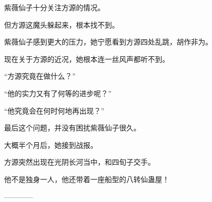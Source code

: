 \begin{this_body}
紫薇仙子十分关注方源的情况。

但方源这魔头躲起来，根本找不到。

紫薇仙子感到更大的压力，她宁愿看到方源四处乱跳，胡作非为。

现在关于方源的近况，她根本连一丝风声都听不到。

“方源究竟在做什么？”

“他的实力又有了何等的进步呢？”

“他究竟会在何时何地再出现？”

最后这个问题，并没有困扰紫薇仙子很久。

大概半个月后，她接到战报。

方源突然出现在光阴长河当中，和四旬子交手。

他不是独身一人，他还带着一座船型的八转仙蛊屋！

------------

\end{this_body}

